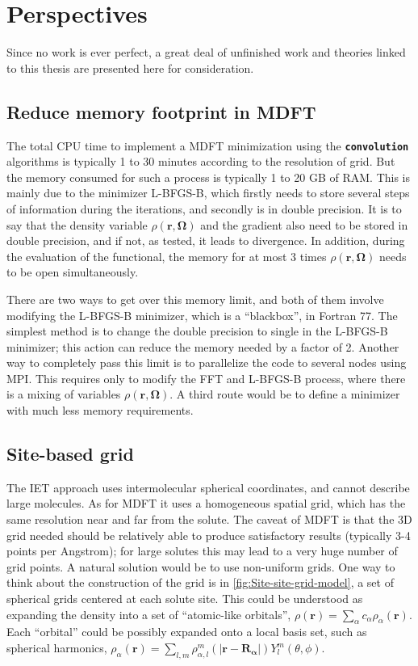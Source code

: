 
\chapter{Perspectives\label{chpt:perspectives}}

Since no work is ever perfect, a great deal of unfinished work and theories
linked to this thesis are presented here for consideration. 

\section{Reduce memory footprint in MDFT}

The total CPU time to implement a \acs{MDFT} minimization using the
\texttt{\textbf{convolution}} algorithms is typically 1 to 30 minutes
according to the resolution of grid. But the memory consumed for such
a process is typically 1 to 20 GB of RAM. This is mainly due to the
minimizer L-BFGS-B, which firstly needs to store several steps of
information during the iterations, and secondly is in double precision.
It is to say that the density variable $\rho(\mathbf{r},\mathbf{\Omega})$
and the gradient also need to be stored in double precision, and if
not, as tested, it leads to divergence. In addition, during the
evaluation of the functional, the memory for at most 3 times $\rho(\mathbf{r},\mathbf{\Omega})$
needs to be open simultaneously.

There are two ways to get over this memory limit, and both of them
involve modifying the L-BFGS-B minimizer, which is a ``blackbox'',
in Fortran 77. The simplest method is to change the double precision
to single in the L-BFGS-B minimizer; this action can reduce the memory
needed by a factor of 2. Another way to completely pass this limit is
to parallelize the code to several nodes using MPI. This requires
only to modify the \acs{FFT} and L-BFGS-B process, where there is
a mixing of variables $\rho(\mathbf{r},\mathbf{\Omega})$. A third
route would be to define a minimizer with much less memory
requirements.

\section{Site-based grid}

The \acs{IET} approach uses intermolecular spherical coordinates,
and cannot describe large molecules. As for \acs{MDFT} it uses a
homogeneous spatial grid, which has the same resolution
near and far from the solute. The caveat of \acs{MDFT} is that the
3D grid needed should be relatively able to produce satisfactory results
(typically 3-4 points per Angstrom); for large solutes this may lead
to a very huge number of grid points. A natural solution would be to use
non-uniform grids. One way to think about the construction of the
grid is in \ref{fig:Site-site-grid-model}, a set of spherical
grids centered at each solute site. This could be understood as expanding
the density into a set of ``atomic-like orbitals'', $\rho(\mathbf{r})=\sum_{\alpha}c_{\alpha}\rho_{\alpha}(\mathbf{r})$.
Each ``orbital'' could be possibly expanded onto a local basis
set, such as spherical harmonics, $\rho_{\alpha}(\mathbf{r})=\sum_{l,m}\rho_{\alpha,l}^{m}(|\mathbf{r}-\mathbf{R_{\alpha}}|)Y_{l}^{m}(\theta,\phi)$.

